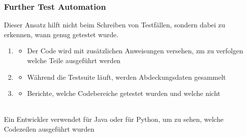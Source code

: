 \subsubsection*{Further Test Automation}
\begin{infoBox}[title=Test Coverage Recording (Testabdeckungs-Aufzeichnung)]
    Dieser Ansatz hilft nicht beim Schreiben von Testfällen, sondern dabei zu erkennen, wann genug getestet wurde.\\
    \begin{enumerate}
        \item {}
        \begin{itemize}
            \item Der Code wird mit zusätzlichen Anweisungen versehen, zm zu verfolgen welche Teile ausgeführt werden
        \end{itemize}
        \item {}
        \begin{itemize}
            \item Während die Testsuite läuft, werden Abdeckungsdaten gesammelt
        \end{itemize}
        \item {}
        \begin{itemize}
            \item Berichte, welche Codebereiche getestet wurden und welche nicht
        \end{itemize}
    \end{enumerate}
    \\
    Ein Entwickler verwendet  für Java oder  für Python, um zu sehen, welche Codezeilen ausgeführt wurden
\end{infoBox}
